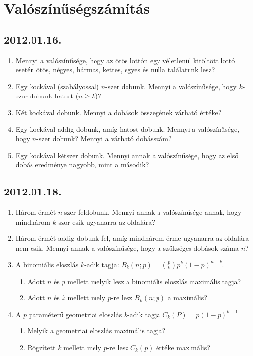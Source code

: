\documentclass{article}
\newenvironment{abc}{\begin{enumerate}[label=\textit{\alph*})]}{\end{enumerate}}
\begin{document}
\section*{Valószínűségszámítás}

\subsection*{2012.01.16.}
\begin{enumerate}
\item
Mennyi a valószínűsége, hogy az ötös lottón egy véletlenül kitöltött lottó esetén ötös, négyes, hármas, kettes, egyes és nulla találatunk lesz?
\item
Egy kockával (szabályossal) $n$-szer dobunk. Mennyi a valószínűsége, hogy $k$-szor dobunk hatost ($n\ge k$)? 
\item
Két kockával dobunk. Mennyi a dobások összegének várható értéke?
\item
Egy kockával addig dobunk, amíg hatost dobunk. Mennyi a valószínűsége, hogy $n$-szer dobunk? Mennyi a várható dobásszám?
\item
Egy kockával kétszer dobunk. Mennyi annak a valószínűsége, hogy az első dobás eredménye nagyobb, mint a második?
\end{enumerate}

\subsection*{2012.01.18.}
\begin{enumerate}
\item
Három érmét $n$-szer feldobunk. Mennyi annak a valószínűsége annak, hogy mindhárom $k$-szor esik ugyanarra az oldalára?
\item
Három érmét addig dobunk fel, amíg mindhárom érme ugyanarra az oldalára nem esik. Mennyi annak a valószínűsége, hogy a szükséges dobások száma $n$?
\item
A binomiális eloszlás $k$-adik tagja: $B_{k}(n;p)=\binom{p}{k}p^k(1-p)^{n-k}$.
\begin{abc}
\item \underline{Adott $n$ és $p$} mellett melyik lesz a binomiális eloszlás maximális tagja?
\item \underline{Adott $n$ és $k$} mellett mely $p$-re lesz $B_{k}(n;p)$ a maximális?
\end{abc}
\item A $p$ paraméterű geometriai eloszlás $k$-adik tagja $C_{k}(P)=p(1-p)^{k-1}$
\begin{abc}
\item Melyik a geometriai eloszlás maximális tagja?
\item Rögzített $k$ mellett mely $p$-re lesz $C_{k}(p)$ értéke maximális?
\end{abc}
\end{enumerate}
\end{document}
